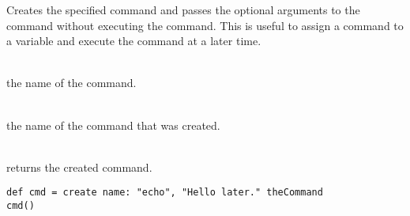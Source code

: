 %


Creates the specified command and passes the optional arguments
to the command without executing the command. This is useful to 
assign a command to a variable and execute the command at a later time.

\begin{asparadesc}
%
\item[\code{name: name}] \hfill \\
the name of the command.
%
\item[\code{theCommandName}] \hfill \\
the name of the command that was created.
%
\item[\code{theCommand}] \hfill \\
returns the created command.
%
\end{asparadesc}

\begin{lstlisting}[style=Groovybash, label={lst:example_create}, title={
Create command for a later execution.}]
def cmd = create name: "echo", "Hello later." theCommand
cmd()
\end{lstlisting}

